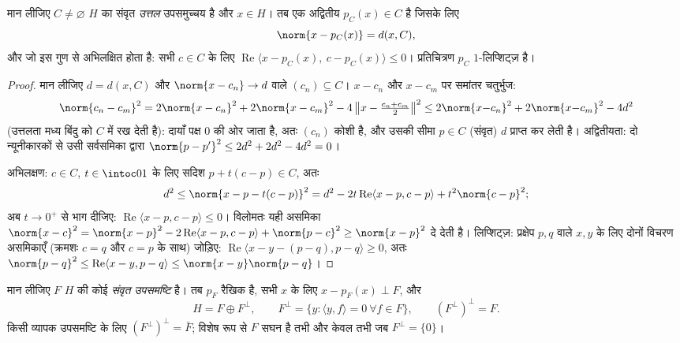 \begin{theorem}[किसी संवृत उत्तल समुच्चय पर प्रक्षेप]
\label{thm:b3:hilbert:projection}
मान लीजिए $C \neq \varnothing$  $H$ का संवृत \emph{उत्तल}
उपसमुच्चय है और $x \in H$। तब एक अद्वितीय $p_C(x)
\in C$ है जिसके
लिए
\[
\norm{x - p_C(x)} = d(x, C),
\]
और जो इस गुण से अभिलक्षित होता है: सभी $c \in C$ के लिए $\operatorname{Re}\langle x - p_C(x),\ c -
p_C(x)\rangle \leq 0$।
प्रतिचित्रण $p_C$ $1$-लिप्शिट्ज़ है।
\end{theorem}

\begin{proof}
मान लीजिए $d = d(x, C)$ और $\norm{x - c_n}
\to d$ वाले $(c_n) \subseteq C$। $x - c_n$ और $x - c_m$ पर समांतर चतुर्भुज:
\[
\norm{c_n - c_m}^2 = 2\norm{x - c_n}^2 + 2\norm{x - c_m}^2 -
4\,\bigl\|x - \tfrac{c_n + c_m}2\bigr\|^2
\leq 2\norm{x{-}c_n}^2 + 2\norm{x{-}c_m}^2 - 4d^2
\]
(उत्तलता मध्य बिंदु को $C$ में रख देती है): दायाँ पक्ष $0$ की ओर
जाता है, अतः $(c_n)$ कोशी है, और उसकी सीमा $p \in C$ (संवृत) $d$ प्राप्त
कर लेती है। अद्वितीयता: दो न्यूनीकारकों से उसी सर्वसमिका द्वारा
$\norm{p - p'}^2 \leq 2d^2 + 2d^2 - 4d^2 = 0$।

अभिलक्षण: $c \in C$, $t \in \intoc01$ के लिए सदिश $p + t(c - p) \in C$, अतः
\[
d^2 \leq \norm{x - p - t(c-p)}^2
= d^2 - 2t\operatorname{Re}\langle x - p, c - p\rangle +
t^2\norm{c-p}^2 ;
\]
अब $t \to 0^+$ से भाग दीजिए: $\operatorname{Re}\langle x - p, c -
p\rangle \leq 0$। विलोमतः यही असमिका $\norm{x -
c}^2 = \norm{x - p}^2 - 2\operatorname{Re}\langle x - p, c -
p\rangle + \norm{p - c}^2 \geq \norm{x-p}^2$ दे देती है।
लिप्शिट्ज़: प्रक्षेप $p, q$ वाले $x, y$ के लिए दोनों विचरण असमिकाएँ
(क्रमशः $c = q$ और $c = p$ के साथ) जोड़िए: $\operatorname{Re}\langle x - y - (p - q), p - q\rangle \geq
0$, अतः $\norm{p - q}^2 \leq \operatorname{Re}\langle x - y, p -
q\rangle \leq \norm{x - y}\norm{p - q}$।
\end{proof}

\begin{theorem}[लांबिक विघटन]
\label{thm:b3:hilbert:decomposition}
मान लीजिए $F$ $H$ की कोई \emph{संवृत उपसमष्टि} है। तब $p_F$
रैखिक है, सभी $x$ के लिए $x - p_F(x) \perp F$, और
\[
H = F \oplus F^\perp,
\qquad F^\perp = \{y : \langle y, f\rangle = 0\ \forall f\in
F\},
\qquad (F^\perp)^\perp = F .
\]
किसी व्यापक उपसमष्टि के लिए $(F^\perp)^\perp = \bar F$; विशेष रूप से $F$ सघन है तभी
और केवल तभी जब $F^\perp = \{0\}$।
\end{theorem}

